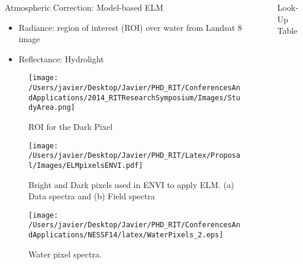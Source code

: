 \documentclass[mathserif]{beamer}
\begin{document}
\begin{frame}{}
\begin{columns}[t]
\begin{column}{.3\linewidth}
\begin{block}{Atmospheric Correction: Model-based ELM}
\begin{itemize}
    \item Radiance: region of interest (ROI) over water from Landsat 8 image
    \vspace{0.5cm}
    \item Reflectance: Hydrolight
\end{itemize}
\vspace{1cm}
\begin{figure}[htb]
  \centering
    \texttt{[image: /Users/javier/Desktop/Javier/PHD\_RIT/ConferencesAndApplications/2014\_RITResearchSymposium/Images/StudyArea.png]}
  \caption{ROI for the Dark Pixel \label{fig:ROIDark} } 
\end{figure}

\begin{figure}[htb]
  \centering
  \texttt{[image: /Users/javier/Desktop/Javier/PHD\_RIT/Latex/Proposal/Images/ELMpixelsENVI.pdf]}
  \caption{Bright and Dark pixels used in ENVI to apply ELM. (a) Data spectra and (b) Field spectra \label{fig:ELMpxsENVI} } 
\end{figure}

\begin{figure}
    \centering
      \texttt{[image: /Users/javier/Desktop/Javier/PHD\_RIT/ConferencesAndApplications/NESSF14/latex/WaterPixels\_2.eps]}
      \caption{Water pixel spectra.}
      \label{fig:waterpxs}
\end{figure}
\vspace{-.2cm}
\end{block}


\end{column}
 \begin{column}{.3\linewidth}
\begin{block}{Look-Up Table}


\end{block}
\end{column}
\end{columns}
\end{frame}
\end{document}
